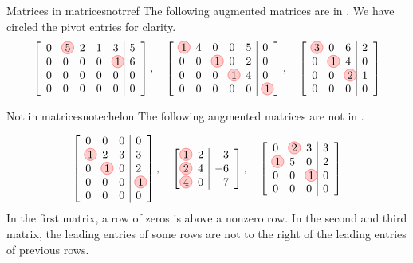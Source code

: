 \begin{example}{Matrices in {\ef}}{matricesnotrref}
  The following augmented matrices are in {\ef}. We have circled the
  pivot entries for clarity.
  \begin{equation*}
    \leftB
    \begin{array}{rrrrr|r}
      0 & \circled{5} & 2 & 1 & 3 & 5 \\
      0 & 0 & 0 & 0 & \circled{1} & 6 \\
      0 & 0 & 0 & 0 & 0 & 0 \\
      0 & 0 & 0 & 0 & 0 & 0
    \end{array}
    \rightB, \quad \leftB
    \begin{array}{rrrrr|r}
      \circled{1} & 4 & 0 & 0 & 5 & 0 \\
      0 & 0 & \circled{1} & 0 & 2 & 0 \\
      0 & 0 & 0 & \circled{1} & 4 & 0 \\
      0 & 0 & 0 & 0 & 0 & \circled{1}
    \end{array}
    \rightB, \quad \leftB
    \begin{array}{rrr|r}
      \circled{3} & 0 & 6 & 2 \\
      0 & \circled{1} & 4 & 0 \\
      0 & 0 & \circled{2} & 1 \\
      0 &  0 & 0 & 0
    \end{array}
    \rightB
  \end{equation*}
\end{example}

\begin{example}{Not in {\ef}}{matricesnotechelon}
The following augmented matrices are not in {\ef}. 

\begin{equation*}
\leftB
\begin{array}{rrr|r}
0 & 0 & 0 & 0 \\
\circled{1} & 2 & 3 & 3 \\
0 & \circled{1} & 0 & 2 \\
0 & 0 & 0 & \circled{1} \\
0 & 0 & 0 & 0
\end{array}
\rightB, \quad \leftB
\begin{array}{rr|r}
\circled{1} & 2 & 3 \\
\circled{2} & 4 & -6 \\
\circled{4} & 0 & 7
\end{array}
\rightB, \quad \leftB
\begin{array}{rrr|r}
0 & \circled{2} & 3 & 3 \\
\circled{1} & 5 & 0 & 2 \\
0 & 0 & \circled{1} & 0 \\
0 & 0 & 0 & 0
\end{array}
\rightB 
\end{equation*}
In the first matrix, a row of zeros is above a nonzero row. In the
second and third matrix, the leading entries of some rows are not to
the right of the leading entries of previous rows.
\end{example}

